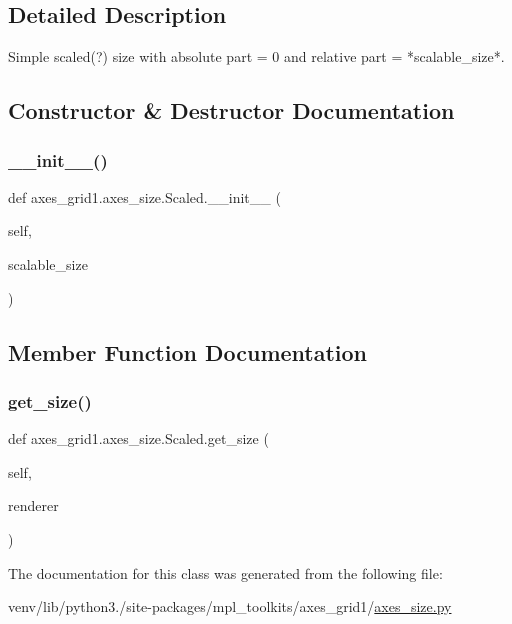 \subsection{Detailed Description}
\begin{DoxyVerb}Simple scaled(?) size with absolute part = 0 and
relative part = *scalable_size*.
\end{DoxyVerb}
 

\subsection{Constructor \& Destructor Documentation}
\mbox{\label{classaxes__grid1_1_1axes__size_1_1Scaled_ad942c758d495cf6d1f650ba40a4142cc}} 
\subsubsection{\texorpdfstring{\+\_\+\+\_\+init\+\_\+\+\_\+()}{\_\_init\_\_()}}
{\footnotesize\ttfamily def axes\+\_\+grid1.\+axes\+\_\+size.\+Scaled.\+\_\+\+\_\+init\+\_\+\+\_\+ (\begin{DoxyParamCaption}\item[{}]{self,  }\item[{}]{scalable\+\_\+size }\end{DoxyParamCaption})}



\subsection{Member Function Documentation}
\mbox{\label{classaxes__grid1_1_1axes__size_1_1Scaled_a73affb87544858ab83202c7fbf035456}} 
\subsubsection{\texorpdfstring{get\+\_\+size()}{get\_size()}}
{\footnotesize\ttfamily def axes\+\_\+grid1.\+axes\+\_\+size.\+Scaled.\+get\+\_\+size (\begin{DoxyParamCaption}\item[{}]{self,  }\item[{}]{renderer }\end{DoxyParamCaption})}



The documentation for this class was generated from the following file\+:\begin{DoxyCompactItemize}
\item 
venv/lib/python3./site-\/packages/mpl\+\_\+toolkits/axes\+\_\+grid1/\hyperlink{_2axes__size_8py}{axes\+\_\+size.\+py}\end{DoxyCompactItemize}
